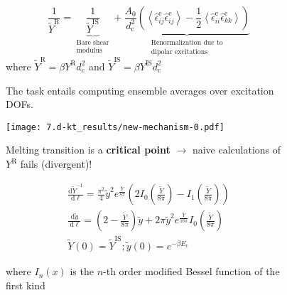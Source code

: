\begin{frame}[c]
\begin{columns}
\begin{column}{0.55\linewidth}
\end{column}

\begin{column}{0.45\linewidth}

\begin{overprint}
\begin{figure}
\vspace{30pt}
$$ \frac{1}{\tilde{Y}^{\mathrm{R}} }= \underbrace{\frac{1}{\tilde{Y}^{\mathrm{IS}}}}_{\substack{\text{Bare shear} \\ \text{modulus}}}+\underbrace{\frac{A_{0}}{d_{\mathrm{c}}^{2}}\left(\left\langle\hat{\epsilon}_{i j}^{\mathrm{e}} \hat{\epsilon}_{i j}^{\mathrm{e}}\right\rangle-\frac{1}{2}\left\langle\hat{\epsilon}_{i i}^{\mathrm{e}} \hat{\epsilon}_{k k}^{\mathrm{e}}\right\rangle\right)}_{\substack{\text{Renormalization due to} \\ \text{dipolar excitations}}} $$
where $\tilde{Y}^\mathrm{R} = \beta Y^\mathrm{R} d_\mathrm{c}^2$ and $\tilde{Y}^\mathrm{IS} = \beta Y^\mathrm{IS} d_\mathrm{c}^2$

\caption{The task entails computing ensemble averages over excitation DOFs.} 

    
\end{figure}

\begin{figure}
\centering\texttt{[image: 7.d-kt\_results/new-mechanism-0.pdf]}\caption{Melting transition is a \textbf{critical point} $\to$ naive calculations of $Y^\mathrm{R}$ fails (divergent)!}
\end{figure}

\begin{figure}
\vspace{30pt}
\begin{gather*}
\frac{\mathrm{d} \tilde{Y}^{-1}}{\mathrm{~d} \ell} =\frac{\pi^{2}}{4} \tilde{y}^{2} e^{\frac{\tilde{Y}}{8 \pi}}\left(2 I_{0}\left(\frac{\tilde{Y}}{8 \pi}\right)-I_{1}\left(\frac{\tilde{Y}}{8 \pi}\right)\right) 
\\
\frac{\mathrm{d} \tilde{y}}{\mathrm{~d} \ell} =\left(2-\frac{\tilde{Y}}{8 \pi}\right) \tilde{y}+2 \pi \tilde{y}^{2} e^{\frac{\tilde{Y}}{16 \pi}} I_{0}\left(\frac{\tilde{Y}}{8 \pi}\right) 
\\
\tilde{Y}(0) = \tilde{Y}^\mathrm{IS}; \tilde{y}(0) = e^{-\beta E_\mathrm{c}}
\end{gather*}

where $I_n(x)$ is the $n$-th order modified Bessel function of the first kind


\end{figure}
\end{overprint}
\end{column}
\end{columns}
\end{frame}
